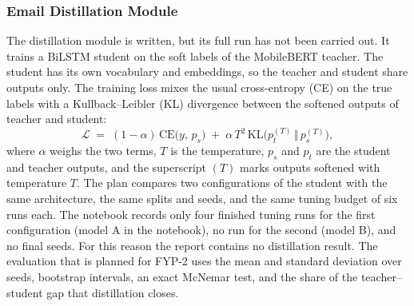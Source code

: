 \documentclass{FastFyp}
\begin{document}
\subsubsection{Email Distillation Module}
\label{sec:impl-distill}
The distillation module is written, but its full run has not been carried out. It trains a BiLSTM student on the soft labels of the MobileBERT teacher. The student has its own vocabulary and embeddings, so the teacher and student share outputs only. The training loss mixes the usual cross-entropy (CE) on the true labels with a Kullback--Leibler (KL) divergence between the softened outputs of teacher and student:
\begin{equation}
	\mathcal{L} \;=\; (1-\alpha)\,\mathrm{CE}\bigl(y,\,p_s\bigr) \;+\; \alpha\,T^{2}\,\mathrm{KL}\bigl(p_t^{(T)} \,\Vert\, p_s^{(T)}\bigr),
	\label{eq:kd-loss}
\end{equation}
where $\alpha$ weighs the two terms, $T$ is the temperature, $p_s$ and $p_t$ are the student and teacher outputs, and the superscript $(T)$ marks outputs softened with temperature $T$. 
The plan compares two configurations of the student with the same architecture, the same splits and seeds, and the same tuning budget of six runs each. The notebook records only four finished tuning runs for the first configuration (model A in the notebook), no run for the second (model B), and no final seeds. For this reason the report contains no distillation result. The evaluation that is planned for FYP-2 uses the mean and standard deviation over seeds, bootstrap intervals, an exact McNemar test, and the share of the teacher--student gap that distillation closes. 
\end{document}
